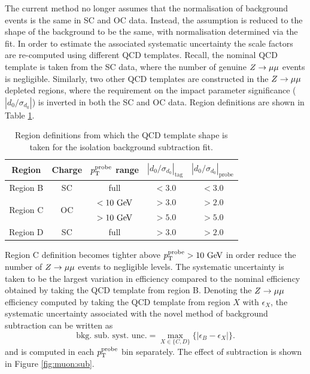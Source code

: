 The current method no longer assumes that the normalisation of background
events is the same in SC and OC data. Instead, the assumption is reduced
to the shape of the background to be the same, with normalisation 
determined via the fit. In order to estimate the associated systematic
uncertainty the scale factors are re-computed using different QCD templates.
Recall, the nominal QCD template is taken from the SC data, where the number of
genuine $Z \rightarrow \mu\mu$ events is negligible. Similarly, two other QCD templates are
constructed in the $Z \rightarrow \mu\mu$ depleted regions, where the requirement on the
impact parameter significance ($|d_0/\sigma_{d_0}|$) is inverted in both
the SC and OC data. Region definitions are shown in Table \ref{tab:muon:reg}.
\begin{table}[h]
\centering
\caption{Region definitions from which the QCD template shape is taken
for the isolation background subtraction fit.}
\label{tab:muon:reg}
\begin{tabular}{c c c c c}
\toprule
Region   & Charge & $p_{\text{T}}^\text{probe}$ range & $|d_0/\sigma_{d_0}|_\text{tag}$ & $|d_0/\sigma_{d_0}|_\text{probe}$ \\
\midrule
Region B & SC & full & $< 3.0$ & $ < 3.0$ \\
\midrule
\multirow{2}{*}{Region C} &  \multirow{2}{*}{OC} & $ < 10~\text{Ge\kern -0.1em V}$ & $ > 3.0$ & $ > 2.0$ \\
                          &                      & $ > 10~\text{Ge\kern -0.1em V}$ & $ > 5.0$ & $ > 5.0$ \\
\midrule
Region D & SC & full & $ > 3.0$ & $ > 2.0$ \\
\bottomrule
\end{tabular}
\end{table}
Region C definition becomes tighter above $p_{\text{T}}^\text{probe} > 10~\text{Ge\kern -0.1em V}$
in order reduce the number of $Z \rightarrow \mu\mu$ events to negligible levels. The
systematic uncertainty is taken to be the largest variation in efficiency
compared to the nominal efficiency obtained by taking the QCD template
from region B. Denoting the $Z \rightarrow \mu\mu$ efficiency computed by taking the
QCD template from region $X$ with $\epsilon_X$, the systematic
uncertainty associated with the novel method of background subtraction
can be written as
\begin{equation}
\text{bkg. sub. syst. unc.} = \max_{X \in \{C, D\}} \{ \vert \epsilon_B - \epsilon_X\vert \}.
\end{equation}
and is computed in each $p_{\text{T}}^\text{probe}$ bin separately. The effect
of subtraction is shown in Figure \ref{fig:muon:sub}.
